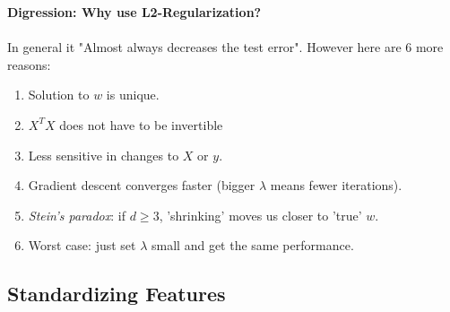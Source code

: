 \documentclass{article}
\def\gre#1{{\color{gre}#1}}
\begin{document}
\begin{siderules}
	\textbf{Digression: Why use L2-Regularization?} \\ \\
	In general it "Almost always decreases the test error". However here are 6 more reasons:
	\begin{enumerate}
		\item Solution to $ w $ is \gre{unique}.
		\item $ X^TX $ \gre{does not have to be invertible}
		\item \gre{Less sensitive} in changes to $ X $ or $ y $. 
		\item Gradient descent \gre{converges faster} (bigger $\lambda$ means fewer iterations).
		\item \textsl{Stein's paradox}: if $ d \geq 3 $, 'shrinking' \gre{moves us closer to 'true' $ w $}.
		\item Worst case: just set $\lambda$ small and get the same performance.
	\end{enumerate}
\end{siderules}

\subsection*{Standardizing Features}
\end{document}
